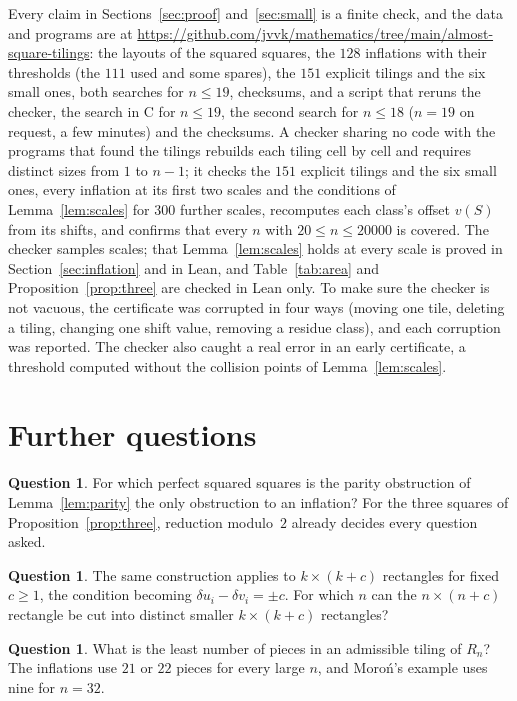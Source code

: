 \documentclass[11pt]{amsart}
\theoremstyle{definition}
\newtheorem{qn}[thm]{Question}
\newcommand{\R}{R}
\begin{document}
Every claim in Sections~\ref{sec:proof} and~\ref{sec:small} is a finite check, and the data and
programs are at \url{https://github.com/jvvk/mathematics/tree/main/almost-square-tilings}: the layouts of the squared squares, the $128$ inflations
with their thresholds (the $111$ used and some spares), the $151$ explicit tilings and the six small
ones, both searches for $n\le19$, checksums, and a script that reruns the checker, the search in C for $n\le19$, the second search for $n\le18$ ($n=19$ on request, a few minutes) and the checksums. A checker
sharing no code with the programs that found the tilings rebuilds each tiling cell by cell and requires
distinct sizes from $1$ to $n-1$; it checks the $151$ explicit tilings and the six small ones, every inflation
at its first two scales and the conditions of Lemma~\ref{lem:scales} for $300$ further scales,
recomputes each class's offset $v(S)$ from its shifts, and confirms that every $n$ with $20\le n\le20000$
is covered. The checker samples scales; that Lemma~\ref{lem:scales} holds at every scale is proved in
Section~\ref{sec:inflation} and in Lean, and Table~\ref{tab:area} and Proposition~\ref{prop:three}
are checked in Lean only. To make sure the checker is not vacuous, the certificate was corrupted in four ways (moving
one tile, deleting a tiling, changing one shift value, removing a residue class), and each corruption
was reported. The checker also caught a real error in an early certificate, a threshold computed
without the collision points of Lemma~\ref{lem:scales}.


\section{Further questions}

\begin{qn}
For which perfect squared squares is the parity obstruction of Lemma~\ref{lem:parity} the only
obstruction to an inflation? For the three squares of Proposition~\ref{prop:three}, reduction
modulo~$2$ already decides every question asked.
\end{qn}

\begin{qn}
The same construction applies to $k\times(k+c)$ rectangles for fixed $c\ge1$, the condition becoming
$\delta u_i-\delta v_i=\pm c$. For which $n$ can the $n\times(n+c)$ rectangle be cut into distinct
smaller $k\times(k+c)$ rectangles?
\end{qn}

\begin{qn}
What is the least number of pieces in an admissible tiling of $\R_n$? The inflations use $21$ or $22$
pieces for every large $n$, and Moro\'n's example uses nine for $n=32$.
\end{qn}
\end{document}
